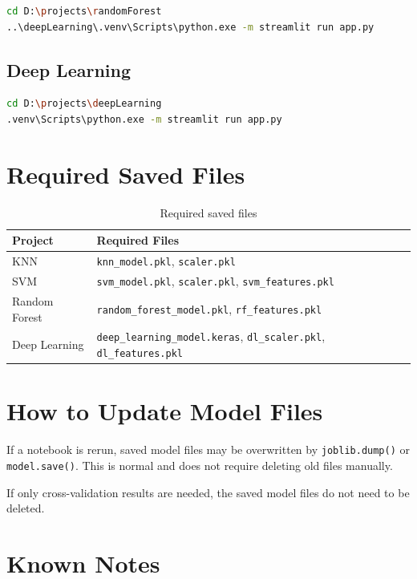 \documentclass[12pt,a4paper]{article}
\begin{document}
\begin{lstlisting}[language=bash]
cd D:\projects\randomForest
..\deepLearning\.venv\Scripts\python.exe -m streamlit run app.py
\end{lstlisting}

\subsection{Deep Learning}

\begin{lstlisting}[language=bash]
cd D:\projects\deepLearning
.venv\Scripts\python.exe -m streamlit run app.py
\end{lstlisting}

\section{Required Saved Files}

\begin{table}[h]
\centering
\begin{tabular}{p{4cm} p{9cm}}
\toprule
\textbf{Project} & \textbf{Required Files} \\
\midrule
KNN & \texttt{knn\_model.pkl}, \texttt{scaler.pkl} \\
SVM & \texttt{svm\_model.pkl}, \texttt{scaler.pkl}, \texttt{svm\_features.pkl} \\
Random Forest & \texttt{random\_forest\_model.pkl}, \texttt{rf\_features.pkl} \\
Deep Learning & \texttt{deep\_learning\_model.keras}, \texttt{dl\_scaler.pkl}, \texttt{dl\_features.pkl} \\
\bottomrule
\end{tabular}
\caption{Required saved files}
\end{table}

\section{How to Update Model Files}

If a notebook is rerun, saved model files may be overwritten by \texttt{joblib.dump()} or \texttt{model.save()}. This is normal and does not require deleting old files manually.

If only cross-validation results are needed, the saved model files do not need to be deleted.

\section{Known Notes}
\end{document}
